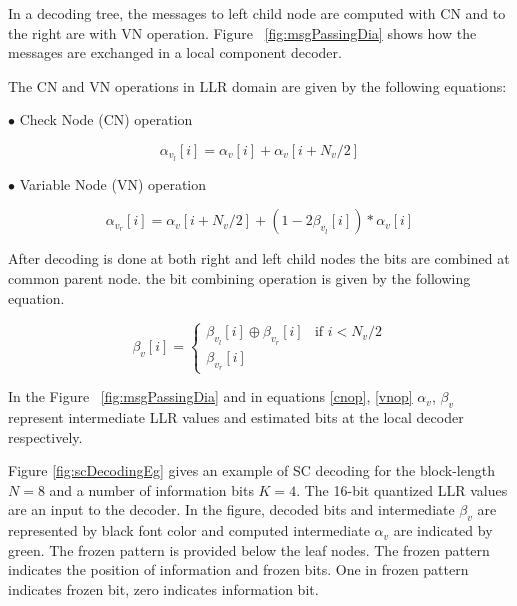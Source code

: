 In a decoding tree, the messages to left child node are computed with CN and to the right are with VN operation.  Figure ~\ref{fig:msgPassingDia} shows how the messages are exchanged in a local component decoder.

The CN and VN operations in LLR domain are given by the following equations:

$\bullet$ Check Node (CN) operation

\begin{equation} \label{cnop}
	\alpha_{v_{l}}[i] = \alpha_{v}[i] + \alpha_{v}[i + N_{v}/2]
\end{equation}

$\bullet$ Variable Node (VN) operation

\begin{equation} \label{vnop}
\alpha_{v_{r}}[i] = \alpha_{v}[i + N_{v}/2] + (1 - 2\beta_{v_{l}}[i]) * \alpha_{v}[i]
\end{equation}

After decoding is done at both right and left child nodes the bits are combined at common parent node. the bit combining operation is given by the following equation.

\begin{equation*} \label{bitCombination}
\beta_{v}[i] = \begin{cases}
				\beta_{v_{l}}[i] \oplus \beta_{v_{r}}[i] & \text{if }i < N_{v}/2 \\
				\beta_{v_{r}}[i]
				\end{cases}
\end{equation*}

In the Figure ~\ref{fig:msgPassingDia} and in equations \eqref{cnop}, \eqref{vnop}  $\alpha_{v}$, $\beta_{v}$ represent intermediate LLR values and estimated bits at the local decoder respectively.

Figure \ref{fig:scDecodingEg} gives an example of SC decoding for the block-length $N=8$ and a number of information bits $K=4$. The 16-bit quantized LLR values are an input to the decoder. In the figure, decoded bits and intermediate $\beta_{v}$ are represented by black font color and computed intermediate $\alpha_{v}$ are indicated by green. The frozen pattern is provided below the leaf nodes. The frozen pattern indicates the position of information and frozen bits. One in frozen pattern indicates frozen bit, zero indicates information bit.

